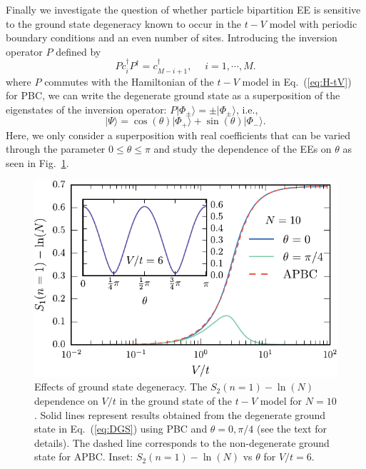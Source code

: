 Finally we investigate the question of whether particle bipartition EE is
sensitive to the ground state degeneracy known to occur in the $t-V$
model with periodic boundary conditions and an even number of sites.
Introducing the inversion operator $P$ \cite{KampfSekania:2003} defined by
%
\begin{equation}
Pc^{\dagger}_{i}P^{\dagger}=c^{\dagger}_{M-i+1},
\quad \;i=1, \cdots, M.
\label{eq:inversion}
\end{equation}
%
where $P$ commutes with the Hamiltonian of the $t-V$ model in
Eq.~(\ref{eq:H-tV}) for PBC, we can write the degenerate ground state as a
superposition of the eigenstates of the inversion operator: $P\vert
\Phi_{\pm}\rangle=\pm\vert \Phi_{\pm}\rangle$, i.e.,
%
\begin{equation}
\vert \Psi\rangle=\cos(\theta) \vert \Phi_{+}\rangle+\sin(\theta) \vert \Phi_- \rangle. 
\label{eq:DGS}
\end{equation}
%
Here, we only consider a superposition with real coefficients that can be
varied through the parameter $0\leq\theta\leq\pi$ and study the 
dependence of the \ren EEs on $\theta$ as seen in Fig.~\ref{fig:Sthetadep}. 
%
\begin{figure}[h]
\begin{center}
\includegraphics[width=0.7\columnwidth]{Images/ParticleEntanglement/PPE_degenerate_state.pdf}
\end{center}
\caption{Effects of ground state degeneracy. The $S_2(n=1)-\ln(N)$ dependence
on $V/t$ in the ground state of the $t-V$ model for $N = 10$. Solid lines
represent results obtained from the degenerate ground state in
Eq.~(\ref{eq:DGS}) using PBC and $\theta=0,\pi/4$ (see the text for details).
The dashed line corresponds to the non-degenerate ground state for APBC. Inset:
$S_2(n=1)-\ln(N)$ vs $\theta$ for $V/t=6$.}
\label{fig:Sthetadep}
 \end{figure}
